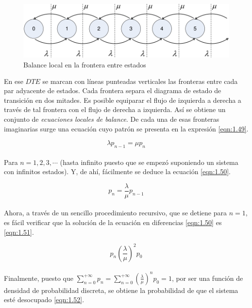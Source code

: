 \begin{figure}[H]
\centering
\includegraphics[width=4.5in]{chapters/chapter3/figures/Figura1-6:Balancelocalenlafronteraentreestados.png}
\caption[Balance local en la frontera entre estados]{Balance local en la frontera entre estados}
\label{fig:mesh6}
\end{figure}    

En ese $DTE$ se marcan con líneas punteadas verticales las fronteras entre cada par adyacente de estados. Cada frontera separa el diagrama de estado de transición en dos mitades. Es posible
equiparar el flujo de izquierda a derecha a través de tal frontera con el flujo de derecha a izquierda. Así se obtiene un conjunto de {\em ecuaciones locales de balance}. De cada una de esas fronteras
imaginarias surge una ecuación cuyo patrón se presenta en la expresión \ref{eqn:1.49}.

\begin{equation}
    \lambda p_{n-1}=\mu p_{n}
    \label{eqn:1.49}
\end{equation}
\\
Para $ n=1,2,3,\cdots $ (hasta infinito puesto que se empezó suponiendo un sistema con infinitos estados). Y, de ahí, fácilmente se deduce la ecuación \ref{eqn:1.50}.

\begin{equation}
    p_{n}=\frac{\lambda}{\mu}p_{n-1}
    \label{eqn:1.50}
\end{equation}
\\
Ahora, a través de un sencillo procedimiento recursivo, que se detiene para $ n=1 $, es fácil verificar que la solución de la ecuación en diferencias \ref{eqn:1.50} es \ref{eqn:1.51}.

\begin{equation}
    p_{n}\left ( \frac{\lambda}{\mu} \right )^{2}p_{0}
    \label{eqn:1.51}
\end{equation}
\\
Finalmente, puesto que $ \displaystyle\sum_{n=0}^{+\infty }p_{n}=\sum_{n=0}^{+\infty }\left ( \frac{\lambda}{\mu} \right )^{n}p_{0}=1 $, por ser una función de densidad de probabilidad discreta, se obtiene la probabilidad de que el sistema esté desocupado \ref{eqn:1.52}.

